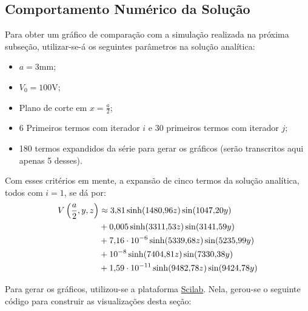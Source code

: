 \documentclass{report}
\begin{document}
\subsection{Comportamento Numérico da Solução}

Para obter um gráfico de comparação com a simulação realizada na próxima subseção, utilizar-se-á os seguintes parâmetros na solução analítica:

\begin{itemize}
  \item $ a = 3 \text{mm}$;
  \item $ V_0 = 100 \text{V}$;
  \item Plano de corte em $ x = \frac{a}{2} $;
  \item 6 Primeiros termos com iterador $ i $ e 30 primeiros termos com iterador $ j $;
  \item 180 termos expandidos da série para gerar os gráficos (serão transcritos aqui apenas 5 desses).
\end{itemize}

Com esses critérios em mente, a expansão de cinco termos da solução analítica, todos com $ i = 1 $, se dá por:
\begin{equation}
  \label{eq:numerical_solution_expanded}
  \centering
  \begin{aligned}
    V\left(\frac{a}{2},y,z\right) &\approx 3,\!81\sinh(1480,\!96z)\sin(1047,\!20y) \\
                                  &+ 0,\!005\sinh(3311,\!53z)\sin(3141,\!59y) \\
                                  &+ 7,\!16\cdot 10^{-6} \sinh(5339,\!68z)\sin(5235,\!99y) \\
                                  &+ 10^{-8} \sinh(7404,\!81z) \sin(7330,\!38y) \\
                                  &+ 1,\!59\cdot 10^{-11} \sinh(9482,\!78z) \sin(9424,\!78y)
  \end{aligned}
\end{equation}

Para gerar os gráficos, utilizou-se a plataforma \href{https://www.scilab.org/download/scilab-2024.1.0}{Scilab}. Nela, gerou-se o seguinte código
para construir as visualizações desta seção:


\end{document}
